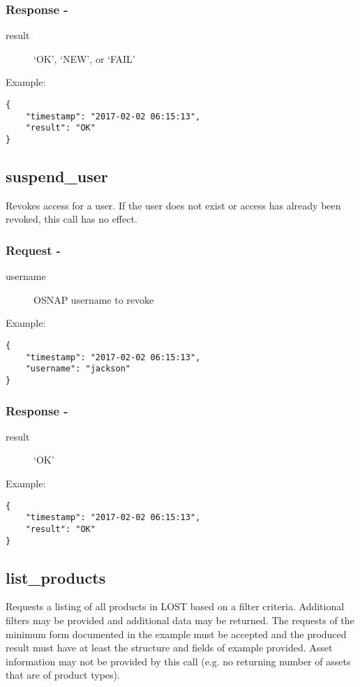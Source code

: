 \subsubsection*{Response -}
\begin{description}
\item[result] `OK', `NEW', or `FAIL'
\end{description}

\noindent Example:
\begin{verbatim}
{
    "timestamp": "2017-02-02 06:15:13",
    "result": "OK"
}
\end{verbatim}


\subsection*{suspend\_user}
Revokes access for a user. If the user does not exist or access has already been revoked, this call has no effect.
\\

\subsubsection*{Request -}
\begin{description}
\item[username] OSNAP username to revoke
\end{description}

\noindent Example:
\begin{verbatim}
{
    "timestamp": "2017-02-02 06:15:13",
    "username": "jackson"
}
\end{verbatim}


\subsubsection*{Response -}
\begin{description}
\item[result] `OK'
\end{description}

\noindent Example:
\begin{verbatim}
{
    "timestamp": "2017-02-02 06:15:13",
    "result": "OK"
}
\end{verbatim}


\subsection*{list\_products}
Requests a listing of all products in LOST based on a filter criteria. Additional filters may be provided and additional data may be returned. The requests of the minimum form documented in the example must be accepted and the produced result must have at least the structure and fields of example provided. Asset information may not be provided by this call (e.g. no returning number of assets that are of product types).
\\

